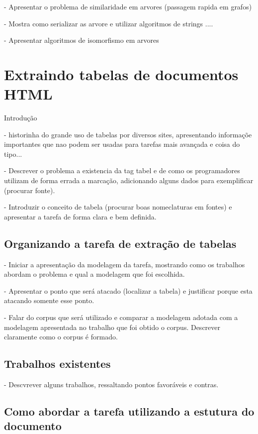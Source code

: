 \documentclass{acm_proc_article-sp}
\numberwithin{equation}{section}
\begin{document}
- Apresentar o problema de similaridade em arvores (passagem rapida em grafos)

- Mostra como serializar as arvore e utilizar algoritmos de strings ....

- Apresentar algoritmos de isomorfismo em arvores


\section{Extraindo tabelas de documentos HTML}

Introdução

- historinha do grande uso de tabelas por diversos sites, apresentando informaçõe importantes que nao podem ser usadas para tarefas mais avançada e coisa do tipo...

- Descrever o problema a existencia da tag tabel e de como os programadores utilizam de forma errada a marcação, adicionando alguns dados para exemplificar (procurar fonte).

- Introduzir o conceito de tabela (procurar boas nomeclaturas em fontes) e apresentar a tarefa de forma clara e bem definida.

\subsection{Organizando a tarefa de extração de tabelas}

- Iniciar a apresentação da modelagem da tarefa, mostrando como os trabalhos abordam o problema e qual a modelagem que foi escolhida.

- Apresentar o ponto que será atacado (localizar a tabela) e justificar porque esta atacando somente esse ponto.

- Falar do corpus que será utilizado e comparar a modelagem adotada com a modelagem apresentada no trabalho que foi obtido o corpus. Descrever claramente como o corpus é formado.

\subsection{Trabalhos existentes}

- Descvrever alguns trabalhos, ressaltando pontos favoráveis e contras.

\subsection{Como abordar a tarefa utilizando a estutura do documento}
\end{document}
